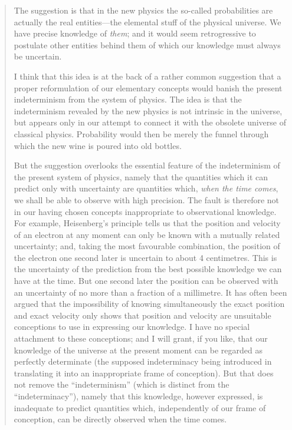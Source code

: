 \begin{quote}
    The suggestion is that in the new physics the so-called probabilities are actually the real entities---the elemental stuff of the physical universe.  We have precise knowledge of \emph{them}; and it would seem retrogressive to postulate other entities behind them of which our knowledge must always be uncertain.  

    I think that this idea is at the back of a rather common suggestion that a proper reformulation of our elementary concepts would banish the present indeterminism from the system of physics.  The idea is that the indeterminism revealed by the new physics is not intrinsic in the universe, but appears only in our attempt to connect it with the obsolete universe of classical physics.  Probability would then be merely the funnel through which the new wine is poured into old bottles.  

    But the suggestion overlooks the essential feature of the indeterminism of the present system of physics, namely that the quantities which it can predict only with uncertainty are quantities which, \emph{when the time comes}, we shall be able to observe with high precision.  The fault is therefore not in our having chosen concepts inappropriate to observational knowledge.  For example, Heisenberg's principle tells us that the position and velocity of an electron at any moment can only be known with a mutually related uncertainty; and, taking the most favourable combination, the position of the electron one second later is uncertain to about 4 centimetres.  This is the uncertainty of the prediction from the best possible knowledge we can have at the time.  But one second later the position can be observed with an uncertainty of no more than a fraction of a millimetre.  It has often been argued that the impossibility of knowing simultaneously the exact position and exact velocity only shows that position and velocity are unsuitable conceptions to use in expressing our knowledge.  I have no special attachment to these conceptions; and I will grant, if you like, that our knowledge of the universe at the present moment can be regarded as perfectly determinate (the supposed indeterminacy being introduced in translating it into an inappropriate frame of conception).  But that does not remove the ``indeterminism'' (which is distinct from the ``indeterminacy''), namely that this knowledge, however expressed, is inadequate to predict quantities which, independently of our frame of conception, can be directly observed when the time comes.  
    

\end{quote}
